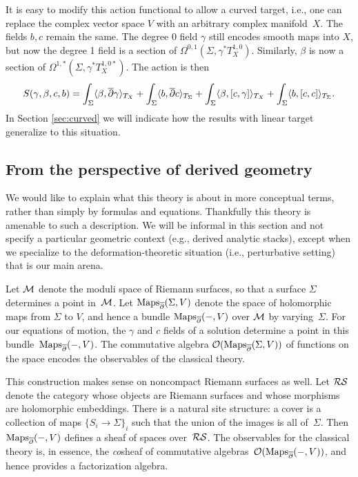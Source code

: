 \begin{rmk}
\label{rmk:curved}
It is easy to modify this action functional to allow a curved target,
i.e., one can replace the complex vector space $V$ with an arbitrary complex manifold~$X$. 
The fields $b,c$ remain the same.
The degree 0 field $\gamma$ still encodes smooth maps into $X$, but now the degree 1 field is a section of $\Omega^{0,1}(\Sigma, \gamma^*T^{1,0}_X)$.
Similarly, $\beta$ is now a section of $\Omega^{1,*}(\Sigma, \gamma^*T^{1,0*}_X)$.
The action is then
\begin{equation}\label{curved action}
S(\gamma,\beta,c,b) = 
\int_\Sigma \langle \beta, \overline{\partial} \gamma \rangle_{T_X}
+ \int_\Sigma \langle b, \overline{\partial} c \rangle_{T_\Sigma} 
+ \int_\Sigma \langle \beta, [c,\gamma] \rangle_{T_X}
+ \int_\Sigma \langle b, [c,c] \rangle_{T_\Sigma}.
\end{equation}
In Section \ref{sec:curved} we will indicate how the results with linear target generalize to this situation.
\end{rmk}

\subsection{From the perspective of derived geometry}

We would like to explain what this theory is about in more conceptual terms,
rather than simply by formulas and equations.
Thankfully this theory is amenable to such a description.
We will be informal in this section and not specify a particular geometric context (e.g., derived analytic stacks),
except when we specialize to the deformation-theoretic situation (i.e., perturbative setting) that is our main arena.

\def\Maps{\operatorname{Maps}}

Let $\mathcal M$ denote the moduli space of Riemann surfaces,
so that a surface $\Sigma$ determines a point in~$\mathcal M$.
Let $\Maps_{\dbar}(\Sigma,V)$ denote the space of holomorphic maps from $\Sigma$ to $V$,
and hence a bundle $\Maps_{\dbar}(-,V)$ over $\mathcal M$ by varying~$\Sigma$.
For our equations of motion, the $\gamma$ and $c$ fields of a solution determine a point in this bundle~$\Maps_{\dbar}(-,V)$. 
The commutative algebra $\cO(\Maps_{\dbar}(\Sigma,V))$ of functions on the space encodes the  observables of the classical theory.

\def\RS{{\cR\cS}}

This construction makes sense on noncompact Riemann surfaces as well.
Let $\RS$ denote the category whose objects are Riemann surfaces and whose morphisms are holomorphic embeddings.
There is a natural site structure: a cover is a collection of maps $\{S_i \to \Sigma\}_i$ such that the union of the images is all of~$\Sigma$.
Then $\Maps_{\dbar}(-,V)$ defines a sheaf of spaces over~$\RS$.
The observables for the classical theory is, in essence, the {\em co}\/sheaf of commutative algebras~$\cO(\Maps_{\dbar}(-,V))$,
and hence provides a factorization algebra.

